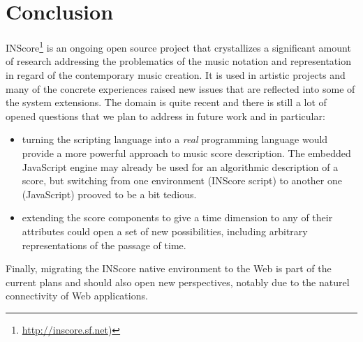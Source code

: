 \documentclass[11pt,a4paper]{article}
\begin{document}
\section{Conclusion}

INScore\footnote{\url{http://inscore.sf.net})} is an ongoing open source project 
that crystallizes a significant amount of research addressing the problematics of the music notation and representation in regard of the contemporary music creation. It is used in artistic projects and many of the concrete experiences raised new issues that are reflected into some of the system extensions. The domain is quite recent and there is still a lot of opened questions that we plan to address in future work and in particular: 
\begin{itemize}
\item turning the scripting language into a \emph{real} programming language would provide a more powerful approach to music score description. The embedded JavaScript engine may already be used for an algorithmic description of a score, but switching from one environment (INScore script) to another one (JavaScript) prooved to be a bit tedious.
\item extending the score components to give a time dimension to any of their attributes could open a set of new possibilities, including arbitrary representations of the passage of time.
\end{itemize}
Finally, migrating the INScore native environment to the Web is part of the current plans and should also open new perspectives, notably due to the naturel connectivity of Web applications.


\balance


\end{document}
